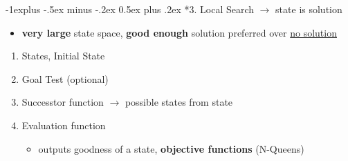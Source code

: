 \documentclass[10pt,landscape]{article}
\makeatletter
\renewcommand{\subsection}{\@startsection{subsection}{2}{0mm}%
                                {-1explus -.5ex minus -.2ex}%
                                {0.5ex plus .2ex}%
                                {\normalfont\normalsize\bfseries}}
\makeatother
\begin{document}
\begin{multicols*}{3}

\subsection*{3. Local Search \texorpdfstring{\scriptsize{$\rightarrow$ state is solution}}{}}
\begin{itemize}[topsep=0pt,noitemsep,wide=0pt, leftmargin=\dimexpr{} + 2\relax]
  \item \textbf{very large} state space, \textbf{good enough} solution preferred over \underline{no solution}
\end{itemize}
\begin{multicols*}{2}
\begin{enumerate}[topsep=0pt,noitemsep,wide=0pt, leftmargin=\dimexpr\labelwidth + 2\labelsep\relax]
  \item States, Initial State
  \item Goal Test (optional)
  \item Successtor function $\rightarrow$ possible states from state
  \columnbreak
  \item Evaluation function
  \begin{itemize}[topsep=0pt,noitemsep,wide=0pt, leftmargin=\dimexpr{} + 2\relax]
    \item outputs goodness of a state, \textbf{objective functions} (N-Queens)
  \end{itemize}
\end{enumerate}
\end{multicols*}


\end{multicols*}
\end{document}

